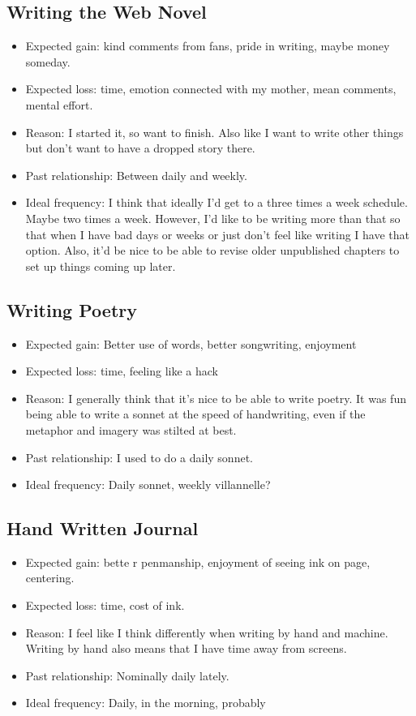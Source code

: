 \documentclass[12pt]{article}
\renewcommand{\,}{\textsuperscript{,}}
\begin{document}
\subsection{Writing the Web Novel}
\begin{itemize}
    \item Expected gain: kind comments from fans, pride in writing, maybe money someday.
    \item Expected loss: time, emotion connected with my mother, mean comments, mental effort.
    \item Reason: I started it, so want to finish. Also like I want to write other things but don't want to have a dropped story there.
    \item Past relationship: Between daily and weekly.
    \item Ideal frequency: I think that ideally I'd get to a three times a week schedule. Maybe two times a week.
    However, I'd like to be writing more than that so that when I have bad days or weeks or just don't feel like writing I have that option.
    Also, it'd be nice to be able to revise older unpublished chapters to set up things coming up later.
\end{itemize}

\subsection{Writing Poetry}
\begin{itemize}
    \item Expected gain: Better use of words, better songwriting, enjoyment
    \item Expected loss: time, feeling like a hack
    \item Reason: I generally think that it's nice to be able to write poetry.
    It was fun being able to write a sonnet at the speed of handwriting, even if the metaphor and imagery was stilted at best.
    \item Past relationship: I used to do a daily sonnet.
    \item Ideal frequency: Daily sonnet, weekly villannelle?
\end{itemize}
\subsection{Hand Written Journal}
\begin{itemize}
    \item Expected gain: bette  r penmanship, enjoyment of seeing ink on page, centering.
    \item Expected loss: time, cost of ink.
    \item Reason: I feel like I think differently when writing by hand and machine.
    Writing by hand also means that I have time away from screens.
    \item Past relationship: Nominally daily lately.
    \item Ideal frequency: Daily, in the morning, probably
\end{itemize}
\end{document}
